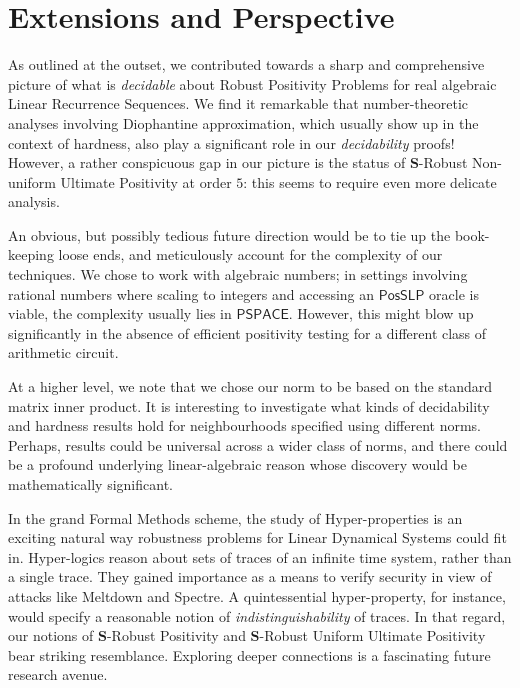 \section{Extensions and Perspective}
As outlined at the outset, we contributed towards a sharp and comprehensive picture of what is \textit{decidable} about Robust Positivity Problems for real algebraic Linear Recurrence Sequences. We find it remarkable that number-theoretic analyses involving Diophantine approximation, which usually show up in the context of hardness, also play a significant role in our \textit{decidability} proofs! However, a rather conspicuous gap in our picture is the status of $\mathbf{S}$-Robust Non-uniform Ultimate Positivity at order $5$: this seems to require even more delicate analysis. 

An obvious, but possibly tedious future direction would be to tie up the book-keeping loose ends, and meticulously account for the complexity of our techniques. We chose to work with algebraic numbers; in settings involving rational numbers where scaling to integers and accessing an $\mathsf{PosSLP}$ oracle is viable, the complexity usually lies in $\mathsf{PSPACE}$. However, this might blow up significantly in the absence of efficient positivity testing for a different class of arithmetic circuit.

At a higher level, we note that we chose our norm to be based on the standard matrix inner product. It is interesting to investigate what kinds of decidability and hardness results hold for neighbourhoods specified using different norms. Perhaps, results could be universal across a wider class of norms, and there could be a profound underlying linear-algebraic reason whose discovery would be mathematically significant.

In the grand Formal Methods scheme, the study of Hyper-properties \cite{hyperproperties} is an exciting natural way robustness problems for Linear Dynamical Systems could fit in. Hyper-logics reason about sets of traces of an infinite time system, rather than a single trace. They gained importance as a means to verify security in view of attacks like Meltdown and Spectre. A quintessential hyper-property, for instance, would specify a reasonable notion of \textit{indistinguishability} of traces. In that regard, our notions of $\mathbf{S}$-Robust Positivity and $\mathbf{S}$-Robust Uniform Ultimate Positivity bear striking resemblance. Exploring deeper connections is a fascinating future research avenue.
